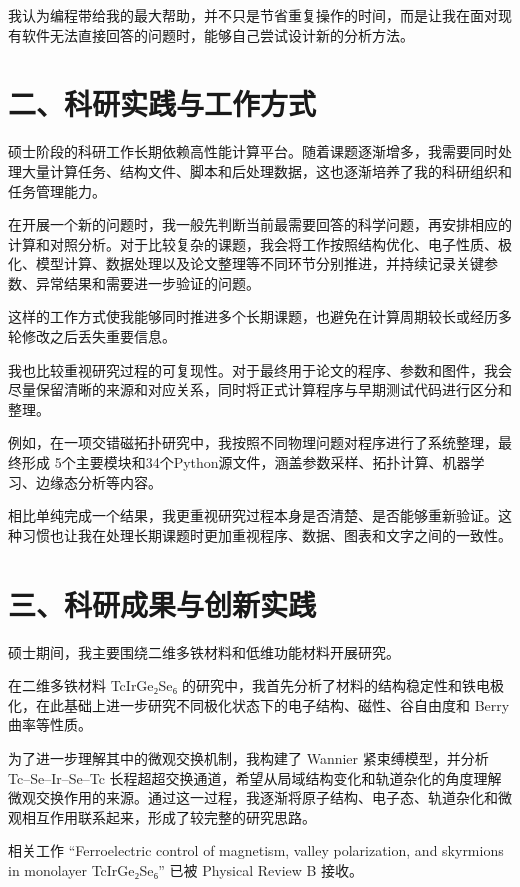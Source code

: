 我认为编程带给我的最大帮助，并不只是节省重复操作的时间，而是让我在面对现有软件无法直接回答的问题时，能够自己尝试设计新的分析方法。

\section{二、科研实践与工作方式}

硕士阶段的科研工作长期依赖高性能计算平台。随着课题逐渐增多，我需要同时处理大量计算任务、结构文件、脚本和后处理数据，这也逐渐培养了我的科研组织和任务管理能力。

在开展一个新的问题时，我一般先判断当前最需要回答的科学问题，再安排相应的计算和对照分析。对于比较复杂的课题，我会将工作按照结构优化、电子性质、极化、模型计算、数据处理以及论文整理等不同环节分别推进，并持续记录关键参数、异常结果和需要进一步验证的问题。

这样的工作方式使我能够同时推进多个长期课题，也避免在计算周期较长或经历多轮修改之后丢失重要信息。

我也比较重视研究过程的可复现性。对于最终用于论文的程序、参数和图件，我会尽量保留清晰的来源和对应关系，同时将正式计算程序与早期测试代码进行区分和整理。

例如，在一项交错磁拓扑研究中，我按照不同物理问题对程序进行了系统整理，最终形成 5个主要模块和34个Python源文件，涵盖参数采样、拓扑计算、机器学习、边缘态分析等内容。

相比单纯完成一个结果，我更重视研究过程本身是否清楚、是否能够重新验证。这种习惯也让我在处理长期课题时更加重视程序、数据、图表和文字之间的一致性。

\section{三、科研成果与创新实践}

硕士期间，我主要围绕二维多铁材料和低维功能材料开展研究。

在二维多铁材料 TcIrGe₂Se₆ 的研究中，我首先分析了材料的结构稳定性和铁电极化，在此基础上进一步研究不同极化状态下的电子结构、磁性、谷自由度和 Berry曲率等性质。

为了进一步理解其中的微观交换机制，我构建了 Wannier 紧束缚模型，并分析 Tc–Se–Ir–Se–Tc 长程超超交换通道，希望从局域结构变化和轨道杂化的角度理解微观交换作用的来源。通过这一过程，我逐渐将原子结构、电子态、轨道杂化和微观相互作用联系起来，形成了较完整的研究思路。

相关工作 “Ferroelectric control of magnetism, valley polarization, and skyrmions in monolayer TcIrGe₂Se₆” 已被 Physical Review B 接收。

